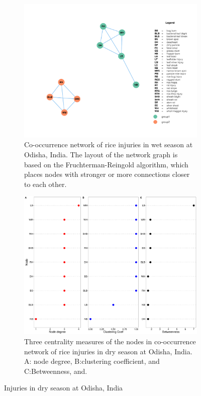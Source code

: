 \begin{figure}
    \centering
    \begin{subfigure}[b]{1\textwidth}
        \includegraphics[width = 1\textwidth]{figures/networkOR_ds.pdf}
        \caption{Co-occurrence network of rice injuries in wet season at Odisha, India. The layout of the network graph is based on the Fruchterman-Reingold algorithm, which places nodes with stronger or more connections closer to each other.}
        \label{fig:networkOR_ds}
    \end{subfigure}
    \begin{subfigure}[b]{1\textwidth}
        \includegraphics[width = 1\textwidth]{figures/nodepropOR_ds.pdf}
        \caption{Three centrality measures of the nodes in co-occurrence network of rice injuries in dry season at Odisha, India. A: node degree, B:clustering coefficient, and C:Betweenness, and.}
        \label{fig:nodepropCP_ds}
    \end{subfigure}
    \caption{Injuries in dry season at Odisha, India}
    \label{fig:OR_ds}
\end{figure}

